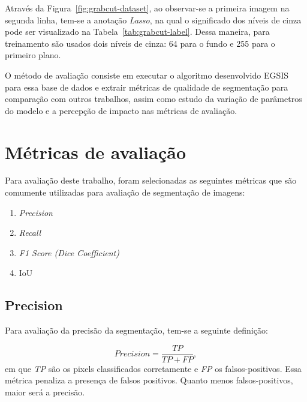 Através da Figura~\ref{fig:grabcut-dataset}, ao observar-se a primeira
imagem na segunda linha, tem-se a anotação \textit{Lasso}, na qual o
significado dos níveis de cinza pode ser visualizado na
Tabela~\ref{tab:grabcut-label}. Dessa maneira, para
treinamento\footnotemark{} são usados dois níveis de cinza: 64 para o
fundo e 255 para o primeiro plano.


O método de avaliação consiste em executar o algoritmo desenvolvido
\gls{EGSIS} para essa base de dados e extrair métricas de qualidade de
segmentação para comparação com outros trabalhos, assim como estudo da
variação de parâmetros do modelo e a percepção de impacto nas métricas
de avaliação.

\section{Métricas de avaliação}\label{sec:metricas-avaliacao}

Para avaliação deste trabalho, foram selecionadas as seguintes métricas
que são comumente utilizadas para avaliação de segmentação de imagens:

\begin{enumerate}
\item \textit{Precision}
\item \textit{Recall}
\item \textit{F1 Score (Dice Coefficient)}
\item IoU
\end{enumerate}


\subsection{Precision}\label{sec:precision}

Para avaliação da precisão da segmentação, tem-se a seguinte definição:

\begin{equation}\label{eq:precision}
  Precision = \dfrac{TP}{TP + FP},
\end{equation}
\noindent
em que \textit{TP} são os pixels classificados corretamente e \textit{FP}
os falsos-positivos. Essa métrica penaliza a presença de falsos
positivos. Quanto menos falsos-positivos, maior será a precisão.


